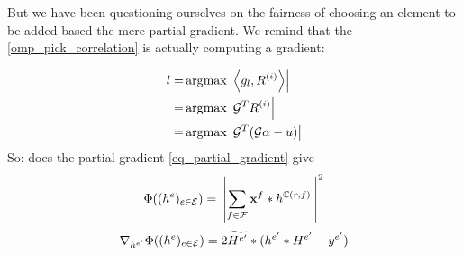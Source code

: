 But we have been questioning ourselves on the fairness of choosing an element to be added based the mere partial gradient. We remind that the \ref{omp_pick_correlation} is actually computing a gradient:

\begin{align*}
l =& \operatorname*{\arg\!\max} \left|\left< g_l,R^{(i)} \right>\right| \\
=& \operatorname*{\arg\!\max} \left| \mathcal{G}^TR^{(i)}\right| \\
=& \operatorname*{\arg\!\max} \left| \mathcal{G}^T(\mathcal{G}\alpha - u)\right| \\
\end{align*}
So: does the partial gradient \ref{eq_partial_gradient} give 
\begin{align*}
\Phi((h^e)_{e \in \mathcal E}) = \left\| \sum_{f\in\mathcal F} \mathbf x^f * h^{\mathbb C(r,f)} \right\|^2
\end{align*}
\begin{align*} 
\nabla_{h^{e'}}\Phi((h^e)_{e \in \mathcal E}) = 2 \widetilde{H^{e'}} * (h^{e'}*H^{e'}-y^{e'})
\end{align*} \label{eq_partial_gradient}






